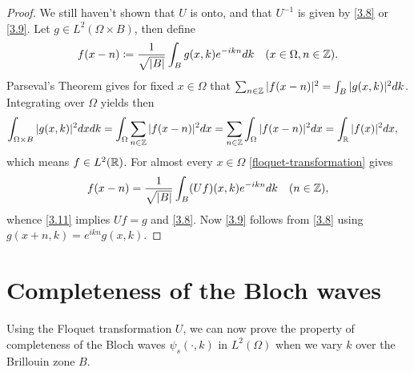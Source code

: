 \begin{theorem}
\begin{proof}
		We still haven't shown that $U$ is onto, and that $U^{-1}$ is given by \eqref{3.8} or \eqref{3.9}. Let $g \in L^{2}(\Omega \times B)$, then define
		\begin{equation}
			f(x - n) \coloneqq \frac{1}{\sqrt{|B|}} \int_{B} g(x, k) e^{-ikn} dk \quad (x \in \Omega, n \in\mathbb{Z}).\label{3.11}
		\end{equation}
		Parseval's Theorem gives for fixed $x \in \Omega$ that $\sum_{n \in \mathbb{Z}} |f(x - n)|^{2} = \int_{B} |g(x, k)|^{2} dk$. Integrating over $\Omega$  yields then
		\begin{align*}
			\int_{\Omega \times B} |g(x, k)|^{2} dx dk & = \int_{\Omega} \sum_{n \in \mathbb{Z}} |f(x - n)|^{2} dx  = \sum_{n \in\mathbb{Z}} \int_{\Omega} |f(x-n)|^{2} dx = \int_{\mathbb{R}} |f(x)|^{2} dx,	
		\end{align*}
		which means $f \in L^{2}(\mathbb{R})$. For almost every $x \in \Omega$ \eqref{floquet-transformation} gives
		\[ f(x - n) = \frac{1}{\sqrt{|B|}} \int_{B} (Uf)(x,k) e^{-ikn} dk \quad (n \in \mathbb{Z}), \]
		whence \eqref{3.11} implies $U f = g$ and \eqref{3.8}. Now \eqref{3.9} follows from \eqref{3.8} using $g(x + n, k) = e^{ikn} g(x, k)$.
	\end{proof}				
\end{theorem}

\section{Completeness of the Bloch waves}

Using the Floquet transformation $U$, we can now prove the property of completeness of the Bloch waves $\psi_{s}(\cdot, k)$ in $L^{2}(\Omega)$ when we vary $k$ over the Brillouin zone $B$.
	
